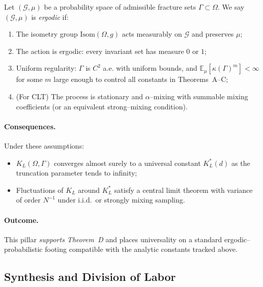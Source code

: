 \begin{definition}
Let \((\mathcal{G},\mu)\) be a probability space of admissible fracture sets
\(\Gamma\subset\Omega\). We say \((\mathcal{G},\mu)\) is \emph{ergodic} if:
\begin{enumerate}
  \item The isometry group \(\mathrm{Isom}(\Omega,g)\) acts measurably on
  \(\mathcal{G}\) and preserves \(\mu\);
  \item The action is ergodic: every invariant set has measure \(0\) or \(1\);
  \item Uniform regularity: \(\Gamma\) is \(C^2\) a.e. with uniform bounds, and
  \(\mathbb{E}_\mu[\kappa(\Gamma)^m]<\infty\) for some \(m\) large enough to
  control all constants in Theorems~A–C;
  \item (For CLT) The process is stationary and \(\alpha\)–mixing with summable
  mixing coefficients (or an equivalent strong–mixing condition).
\end{enumerate}
\end{definition}

\paragraph{Consequences.}
Under these assumptions:
\begin{itemize}
  \item \(K_L(\Omega,\Gamma)\) converges almost surely to a universal constant
  \(K_L^\ast(d)\) as the truncation parameter tends to infinity;
  \item Fluctuations of \(K_L\) around \(K_L^\ast\) satisfy a central limit
  theorem with variance of order \(N^{-1}\) under i.i.d.\ or strongly mixing
  sampling.
\end{itemize}

\paragraph{Outcome.}
This pillar \emph{supports Theorem~D} and places universality on a standard
ergodic–probabilistic footing compatible with the analytic constants tracked
above.

\subsection{Synthesis and Division of Labor}

